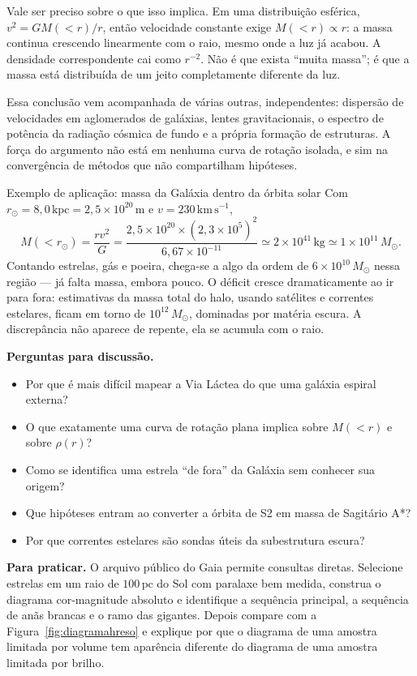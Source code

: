 \documentclass[11pt,a4paper]{article}
\begin{document}
Vale ser preciso sobre o que isso implica. Em uma distribuição esférica, $v^{2}=GM(<r)/r$, então velocidade constante exige $M(<r)\propto r$: a massa continua crescendo linearmente com o raio, mesmo onde a luz já acabou. A densidade correspondente cai como $r^{-2}$. Não é que exista ``muita massa''; é que a massa está distribuída de um jeito completamente diferente da luz.

Essa conclusão vem acompanhada de várias outras, independentes: dispersão de velocidades em aglomerados de galáxias, lentes gravitacionais, o espectro de potência da radiação cósmica de fundo e a própria formação de estruturas. A força do argumento não está em nenhuma curva de rotação isolada, e sim na convergência de métodos que não compartilham hipóteses.

\begin{lessonblock}{Exemplo de aplicação: massa da Galáxia dentro da órbita solar}
Com $r_\odot=8{,}0\,\mathrm{kpc}=2{,}5\times10^{20}\,\mathrm{m}$ e $v=230\,\mathrm{km\,s^{-1}}$,
\[
M(<r_\odot)=\frac{rv^{2}}{G}=\frac{2{,}5\times10^{20}\times(2{,}3\times10^{5})^{2}}{6{,}67\times10^{-11}}\simeq2\times10^{41}\,\mathrm{kg}\simeq1\times10^{11}\,M_\odot.
\]
Contando estrelas, gás e poeira, chega-se a algo da ordem de $6\times10^{10}\,M_\odot$ nessa região --- já falta massa, embora pouco. O déficit cresce dramaticamente ao ir para fora: estimativas da massa total do halo, usando satélites e correntes estelares, ficam em torno de $10^{12}\,M_\odot$, dominadas por matéria escura. A discrepância não aparece de repente, ela se acumula com o raio.
\end{lessonblock}

\textbf{Perguntas para discussão.}
\begin{itemize}
\item Por que é mais difícil mapear a Via Láctea do que uma galáxia espiral externa?
\item O que exatamente uma curva de rotação plana implica sobre $M(<r)$ e sobre $\rho(r)$?
\item Como se identifica uma estrela ``de fora'' da Galáxia sem conhecer sua origem?
\item Que hipóteses entram ao converter a órbita de S2 em massa de Sagitário A*?
\item Por que correntes estelares são sondas úteis da subestrutura escura?
\end{itemize}

\textbf{Para praticar.} O arquivo público do Gaia permite consultas diretas. Selecione estrelas em um raio de $100\,\mathrm{pc}$ do Sol com paralaxe bem medida, construa o diagrama cor-magnitude absoluto e identifique a sequência principal, a sequência de anãs brancas e o ramo das gigantes. Depois compare com a Figura~\ref{fig:diagramahreso} e explique por que o diagrama de uma amostra limitada por volume tem aparência diferente do diagrama de uma amostra limitada por brilho.
\end{document}
